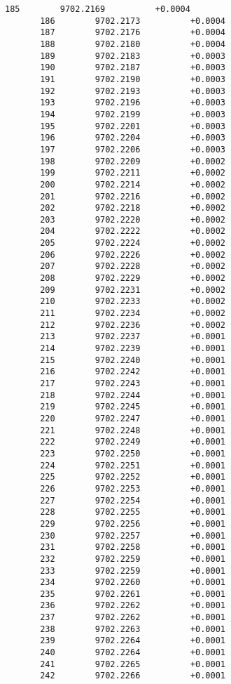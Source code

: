 \documentclass[11pt]{article}
\begin{document}
\begin{Verbatim}[commandchars=\\\{\}]
       185        9702.2169          +0.0004
       186        9702.2173          +0.0004
       187        9702.2176          +0.0004
       188        9702.2180          +0.0004
       189        9702.2183          +0.0003
       190        9702.2187          +0.0003
       191        9702.2190          +0.0003
       192        9702.2193          +0.0003
       193        9702.2196          +0.0003
       194        9702.2199          +0.0003
       195        9702.2201          +0.0003
       196        9702.2204          +0.0003
       197        9702.2206          +0.0003
       198        9702.2209          +0.0002
       199        9702.2211          +0.0002
       200        9702.2214          +0.0002
       201        9702.2216          +0.0002
       202        9702.2218          +0.0002
       203        9702.2220          +0.0002
       204        9702.2222          +0.0002
       205        9702.2224          +0.0002
       206        9702.2226          +0.0002
       207        9702.2228          +0.0002
       208        9702.2229          +0.0002
       209        9702.2231          +0.0002
       210        9702.2233          +0.0002
       211        9702.2234          +0.0002
       212        9702.2236          +0.0002
       213        9702.2237          +0.0001
       214        9702.2239          +0.0001
       215        9702.2240          +0.0001
       216        9702.2242          +0.0001
       217        9702.2243          +0.0001
       218        9702.2244          +0.0001
       219        9702.2245          +0.0001
       220        9702.2247          +0.0001
       221        9702.2248          +0.0001
       222        9702.2249          +0.0001
       223        9702.2250          +0.0001
       224        9702.2251          +0.0001
       225        9702.2252          +0.0001
       226        9702.2253          +0.0001
       227        9702.2254          +0.0001
       228        9702.2255          +0.0001
       229        9702.2256          +0.0001
       230        9702.2257          +0.0001
       231        9702.2258          +0.0001
       232        9702.2259          +0.0001
       233        9702.2259          +0.0001
       234        9702.2260          +0.0001
       235        9702.2261          +0.0001
       236        9702.2262          +0.0001
       237        9702.2262          +0.0001
       238        9702.2263          +0.0001
       239        9702.2264          +0.0001
       240        9702.2264          +0.0001
       241        9702.2265          +0.0001
       242        9702.2266          +0.0001

\end{Verbatim}
\end{document}
